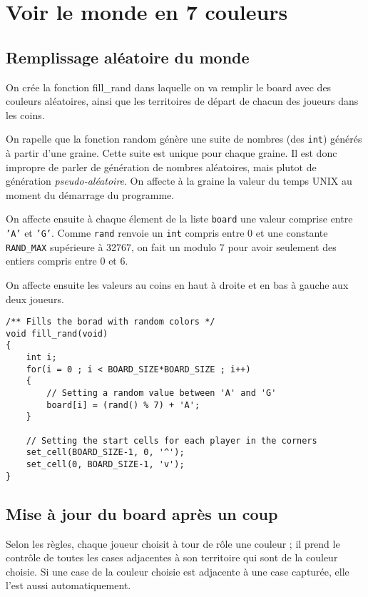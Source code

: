 \documentclass[a4paper,11pt]{article}
\begin{document}
	
	
	
	
	\section{Voir le monde en 7 couleurs}
	
	
	\subsection{Remplissage aléatoire du monde}
	
	On crée la fonction fill\_rand dans laquelle on va remplir le board avec des couleurs aléatoires, ainsi que les territoires de départ de chacun des joueurs dans les coins.
	
	On rapelle que la fonction random génère une suite de nombres (des \texttt{int}) générés à partir d'une graine. Cette suite est unique pour chaque graine. Il est donc impropre de parler de génération de nombres aléatoires, mais plutot de génération \emph{pseudo-aléatoire}. On affecte à la graine la valeur du temps UNIX au moment du d\'emarrage du programme.
	
	On affecte ensuite à chaque élement de la liste \texttt{board} une valeur comprise entre \texttt{'A'} et \texttt{'G'}. Comme \texttt{rand} renvoie un \texttt{int} compris entre 0 et une constante \texttt{RAND\_MAX} supérieure à 32767, on fait un modulo 7 pour avoir seulement des entiers compris entre 0 et 6.
	
	On affecte ensuite les valeurs au coins en haut à droite et en bas à gauche aux deux joueurs.
	
	\begin{lstlisting}
/** Fills the borad with random colors */
void fill_rand(void)
{
	int i;
	for(i = 0 ; i < BOARD_SIZE*BOARD_SIZE ; i++)
	{
		// Setting a random value between 'A' and 'G'
		board[i] = (rand() % 7) + 'A';
	}
	
	// Setting the start cells for each player in the corners
	set_cell(BOARD_SIZE-1, 0, '^');
	set_cell(0, BOARD_SIZE-1, 'v');
}\end{lstlisting}
	
	
	\subsection{Mise à jour du board après un coup}
	\label{MAJ}
	
	Selon les règles, chaque joueur choisit à tour de rôle une couleur ; il prend le contrôle de toutes les cases adjacentes à son territoire qui sont de la couleur choisie. Si une case de la couleur choisie est adjacente à une case capturée, elle l'est aussi automatiquement.
	
\end{document}
